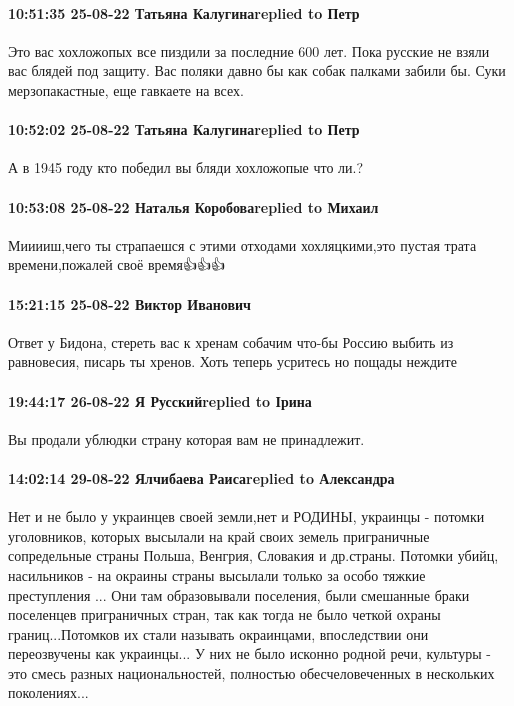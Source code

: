 \paragraph{10:51:35 25-08-22 Татьяна Калугинаreplied to Петр}

Это вас хохложопых все пиздили за последние 600 лет. Пока русские не взяли вас
блядей под защиту. Вас поляки давно бы как собак палками забили бы. Суки
мерзопакастные, еще гавкаете на всех.

\paragraph{10:52:02 25-08-22 Татьяна Калугинаreplied to Петр}

А в 1945 году кто победил вы бляди хохложопые что ли.?

\paragraph{10:53:08 25-08-22 Наталья Коробоваreplied to Михаил}

Мииииш,чего ты страпаешся с этими отходами хохляцкими,это пустая трата
времени,пожалей своё время👍👍👍

\paragraph{15:21:15 25-08-22 Виктор Иванович}

Ответ у Бидона, стереть вас к хренам собачим что-бы Россию выбить из
равновесия, писарь ты хренов. Хоть теперь усритесь но пощады неждите

\paragraph{19:44:17 26-08-22 Я Русскийreplied to Ірина}

Вы продали ублюдки страну которая вам не принадлежит.

\paragraph{14:02:14 29-08-22 Ялчибаева Раисаreplied to Александра}

Нет и не было у украинцев своей земли,нет и РОДИНЫ, украинцы - потомки уголовников, которых высылали на край своих земель приграничные сопредельные страны Польша, Венгрия, Словакия и др.страны.
Потомки убийц, насильников - на окраины страны высылали только за особо тяжкие преступления ...
Они там образовывали поселения, были смешанные браки поселенцев приграничных стран, так как тогда не было четкой охраны границ...Потомков их стали называть окраинцами, впоследствии они переозвучены как украинцы...
У них не было исконно родной речи, культуры - это смесь разных национальностей, полностью обесчеловеченных в нескольких поколениях...

